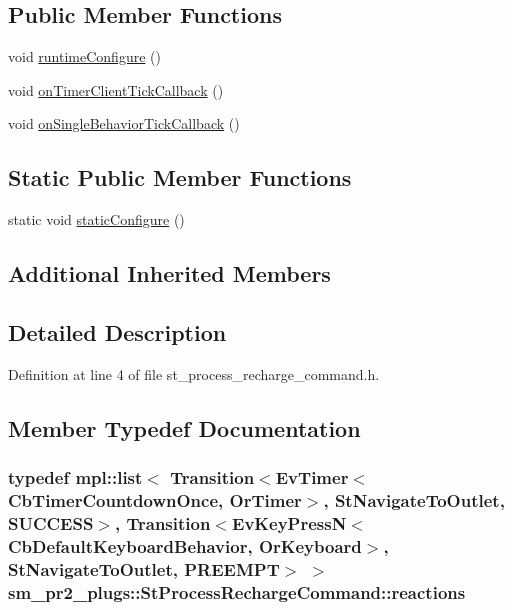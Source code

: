 \subsection*{Public Member Functions}
\begin{DoxyCompactItemize}
\item 
void \hyperlink{structsm__pr2__plugs_1_1StProcessRechargeCommand_ae401a2e897f446ddbde833e7686fcd7a}{runtime\+Configure} ()
\item 
void \hyperlink{structsm__pr2__plugs_1_1StProcessRechargeCommand_a71c620cbe618019ad7338c9b88639c68}{on\+Timer\+Client\+Tick\+Callback} ()
\item 
void \hyperlink{structsm__pr2__plugs_1_1StProcessRechargeCommand_acc2a9e8dbb67f236e16eafb4db51c3c5}{on\+Single\+Behavior\+Tick\+Callback} ()
\end{DoxyCompactItemize}
\subsection*{Static Public Member Functions}
\begin{DoxyCompactItemize}
\item 
static void \hyperlink{structsm__pr2__plugs_1_1StProcessRechargeCommand_ad4c6ec976c76402dd0fe6002036d2462}{static\+Configure} ()
\end{DoxyCompactItemize}
\subsection*{Additional Inherited Members}


\subsection{Detailed Description}


Definition at line 4 of file st\+\_\+process\+\_\+recharge\+\_\+command.\+h.



\subsection{Member Typedef Documentation}
\subsubsection[{\texorpdfstring{reactions}{reactions}}]{\setlength{\rightskip}{0pt plus 5cm}typedef mpl\+::list$<$ Transition$<$Ev\+Timer$<$Cb\+Timer\+Countdown\+Once, {\bf Or\+Timer}$>$, {\bf St\+Navigate\+To\+Outlet}, {\bf S\+U\+C\+C\+E\+SS}$>$, Transition$<$Ev\+Key\+PressN$<$Cb\+Default\+Keyboard\+Behavior, {\bf Or\+Keyboard}$>$, {\bf St\+Navigate\+To\+Outlet}, {\bf P\+R\+E\+E\+M\+PT}$>$ $>$ {\bf sm\+\_\+pr2\+\_\+plugs\+::\+St\+Process\+Recharge\+Command\+::reactions}}\hypertarget{structsm__pr2__plugs_1_1StProcessRechargeCommand_a518876250b66fbe9f710fa42da8f51cb}{}\label{structsm__pr2__plugs_1_1StProcessRechargeCommand_a518876250b66fbe9f710fa42da8f51cb}


